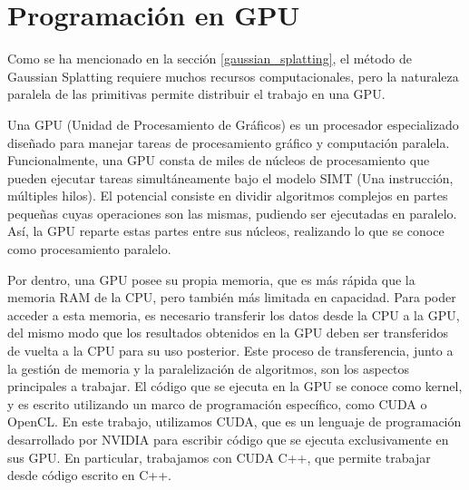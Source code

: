 \section{Programación en GPU}

Como se ha mencionado en la sección \ref{gaussian_splatting}, el método de Gaussian Splatting requiere muchos recursos computacionales, pero la naturaleza paralela de las primitivas permite distribuir el trabajo en una GPU.

Una GPU (Unidad de Procesamiento de Gráficos) es un procesador especializado diseñado para manejar tareas de procesamiento gráfico y computación paralela.  Funcionalmente, una GPU consta de miles de núcleos de procesamiento que pueden ejecutar tareas simultáneamente bajo el modelo SIMT (Una instrucción, múltiples hilos). El potencial consiste en dividir algoritmos complejos en partes pequeñas cuyas operaciones son las mismas, pudiendo ser ejecutadas en paralelo. Así, la GPU reparte estas partes entre sus núcleos, realizando lo que se conoce como procesamiento paralelo.

Por dentro, una GPU posee su propia memoria, que es más rápida que la memoria RAM de la CPU, pero también más limitada en capacidad. Para poder acceder a esta memoria, es necesario transferir los datos desde la CPU a la GPU, del mismo modo que los resultados obtenidos en la GPU deben ser transferidos de vuelta a la CPU para su uso posterior. Este proceso de transferencia, junto a la gestión de memoria y la paralelización de algoritmos, son los aspectos principales a trabajar. El código que se ejecuta en la GPU se conoce como kernel, y es escrito utilizando un marco de programación específico, como CUDA o OpenCL. En este trabajo, utilizamos CUDA, que es un lenguaje de programación desarrollado por NVIDIA para escribir código que se ejecuta exclusivamente en sus GPU. En particular, trabajamos con CUDA C++, que permite trabajar desde código escrito en C++.



